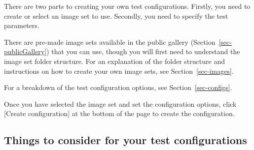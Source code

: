 \documentclass{article}
\begin{document}
There are two parts to creating your own test configurations. Firstly, you need to create or select an image set to use. Secondly, you need to specify the test parameters.

There are pre-made image sets available in the public gallery (Section~\ref{sec-publicGallery}) that you can use, though you will first need to understand the image set folder structure. For an explanation of the folder structure and instructions on how to create your own image sets, see Section~\ref{sec-images}.

For a breakdown of the test configuration options, see Section~\ref{sec-configs}.

Once you have selected the image set and set the configuration options, click [Create configuration] at the bottom of the page to create the configuration.

\subsection{Things to consider for your test configurations}
\end{document}
